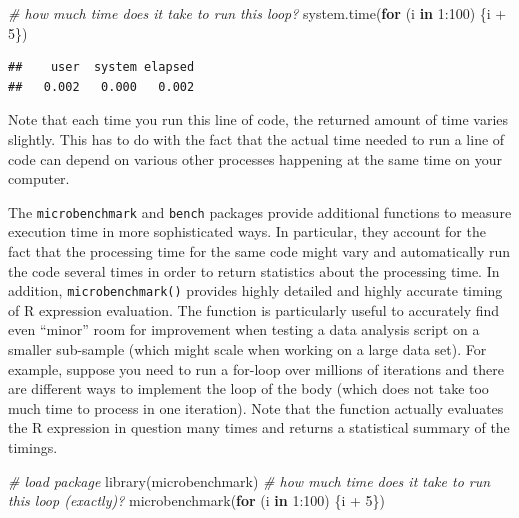 \documentclass[
  12pt,
]{style/krantz}
\newenvironment{Shaded}{\begin{snugshade}}{\end{snugshade}}
\newcommand{\CommentTok}[1]{\textcolor[rgb]{0.56,0.35,0.01}{\textit{#1}}}
\newcommand{\ControlFlowTok}[1]{\textcolor[rgb]{0.13,0.29,0.53}{\textbf{#1}}}
\newcommand{\DecValTok}[1]{\textcolor[rgb]{0.00,0.00,0.81}{#1}}
\newcommand{\FunctionTok}[1]{\textcolor[rgb]{0.00,0.00,0.00}{#1}}
\newcommand{\NormalTok}[1]{#1}
\newcommand{\SpecialCharTok}[1]{\textcolor[rgb]{0.00,0.00,0.00}{#1}}
\begin{document}
\begin{Shaded}
\begin{Highlighting}[]
\CommentTok{\# how much time does it take to run this loop?}
\FunctionTok{system.time}\NormalTok{(}\ControlFlowTok{for}\NormalTok{ (i }\ControlFlowTok{in} \DecValTok{1}\SpecialCharTok{:}\DecValTok{100}\NormalTok{) \{i }\SpecialCharTok{+} \DecValTok{5}\NormalTok{\})}
\end{Highlighting}
\end{Shaded}

\begin{verbatim}
##    user  system elapsed 
##   0.002   0.000   0.002
\end{verbatim}

Note that each time you run this line of code, the returned amount of time varies slightly. This has to do with the fact that the actual time needed to run a line of code can depend on various other processes happening at the same time on your computer.

The \texttt{microbenchmark} and \texttt{bench} packages provide additional functions to measure execution time in more sophisticated ways. In particular, they account for the fact that the processing time for the same code might vary and automatically run the code several times in order to return statistics about the processing time. In addition, \texttt{microbenchmark()} provides highly detailed and highly accurate timing of R expression evaluation. The function is particularly useful to accurately find even ``minor'' room for improvement when testing a data analysis script on a smaller sub-sample (which might scale when working on a large data set). For example, suppose you need to run a for-loop over millions of iterations and there are different ways to implement the loop of the body (which does not take too much time to process in one iteration). Note that the function actually evaluates the R expression in question many times and returns a statistical summary of the timings.

\begin{Shaded}
\begin{Highlighting}[]
\CommentTok{\# load package}
\FunctionTok{library}\NormalTok{(microbenchmark)}
\CommentTok{\# how much time does it take to run this loop (exactly)?}
\FunctionTok{microbenchmark}\NormalTok{(}\ControlFlowTok{for}\NormalTok{ (i }\ControlFlowTok{in} \DecValTok{1}\SpecialCharTok{:}\DecValTok{100}\NormalTok{) \{i }\SpecialCharTok{+} \DecValTok{5}\NormalTok{\})}
\end{Highlighting}
\end{Shaded}
\end{document}
